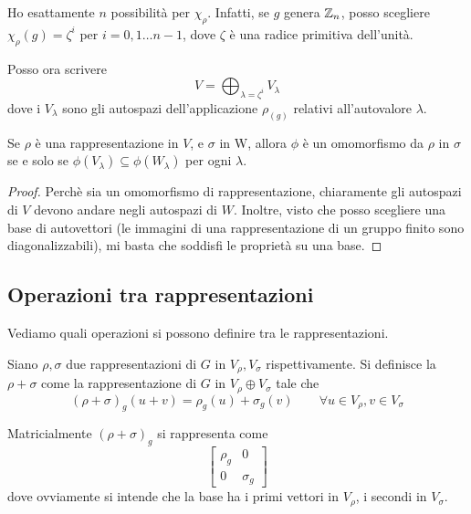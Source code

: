    \begin{myexample}
      Ho esattamente $n$ possibilità per $\chi_\rho$. Infatti, se $g$ genera $\mathbb Z_n$, posso scegliere $\chi_\rho(g)=\zeta^i$ per $i=0,1\dots n-1$, dove $\zeta$ è una radice primitiva dell'unità.
     
      Posso ora scrivere
      \[
       V=\bigoplus_{\lambda=\zeta^i}V_\lambda
      \]
      dove i $V_\lambda$ sono gli autospazi dell'applicazione $\rho_(g)$ relativi all'autovalore $\lambda$.
      
      Se $\rho$ è una rappresentazione in $V$, e $\sigma$ in W, allora $\phi$ è un omomorfismo da $\rho$ in $\sigma$ se e solo se $\phi(V_\lambda)\subseteq \phi(W_\lambda)$ per ogni $\lambda$.
      
      \begin{proof}
       Perchè sia un omomorfismo di rappresentazione, chiaramente gli autospazi di $V$ devono andare negli autospazi di $W$. Inoltre, visto che posso scegliere una base di autovettori (le immagini di una rappresentazione di un gruppo finito sono diagonalizzabili), mi basta che soddisfi le proprietà su una base.
      \end{proof}


    \end{myexample}
    
  \subsection{Operazioni tra rappresentazioni}
    Vediamo quali operazioni si possono definire tra le rappresentazioni.
    
    \begin{mydef}
     Siano $\rho, \sigma$ due rappresentazioni di $G$ in $V_\rho,V_\sigma$ rispettivamente. Si definisce la  $\rho+\sigma$ come la rappresentazione di $G$ in $V_\rho\oplus V_\sigma$ tale che 
     \[
      (\rho+\sigma)_g(u+v)=\rho_g(u)+\sigma_g(v)\qquad \forall u\in V_\rho, v\in V_\sigma
     \]
    \end{mydef}
    
    Matricialmente $(\rho+\sigma)_g$ si rappresenta come
    \[
     \left[\begin{array}{c|c}
	    \rho_g & 0 \\
	    \hline
	    0 & \sigma_g
           \end{array}
     \right]
    \]
    dove ovviamente si intende che la base ha i primi vettori in $V_\rho$, i secondi in $V_\sigma$.
    
